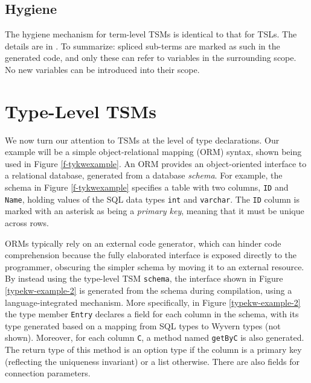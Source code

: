 \documentclass{sig-alternate}[10pt]
\newcommand{\simpleHTMLcolor}[1]{\textcolor[HTML]{7D5100}{#1}}
\newcommand{\boolIfcolor}[1]{\textcolor[HTML]{CD7300}{#1}}
\newcommand{\lstinlinew}[1]{\lstinline[style=wyvern]{#1}}
\begin{document}
\subsection{Hygiene}
The hygiene mechanism for term-level TSMs is identical to that for TSLs. The details are in \cite{TSLs}. To summarize: spliced sub-terms are marked as such in the generated code, and only these can refer to variables in the surrounding scope. No new variables can be introduced into their scope. %


\section{Type-Level TSM\lowercase{s}}\label{tsms-type}
We now turn our attention to TSMs at the level of type declarations. Our example will be a simple object-relational mapping (ORM) syntax, shown being used in Figure \ref{f-tykwexample}. An ORM provides an object-oriented interface to a relational database, generated from a database \emph{schema}. For example, the schema in Figure \ref{f-tykwexample} specifies a table with two columns, \lstinlinew{ID} and \lstinlinew{Name}, holding values of the SQL data types \lstinlinew{int} and \lstinlinew{varchar}. The \lstinlinew{ID} column is marked with an asterisk as being a \emph{primary key}, meaning that it must be unique across rows. 

ORMs typically rely on an external code generator, which can hinder code comprehension because the fully elaborated interface is exposed directly to the programmer, obscuring the simpler schema by moving it to an external resource. By instead using the type-level TSM \lstinlinew{schema}, the interface shown in Figure \ref{typekw-example-2} is generated from the schema during compilation, using a language-integrated mechanism. More specifically, in Figure \ref{typekw-example-2} the type member \lstinlinew{Entry} declares a field for each column in the schema, with its type generated based on a mapping from SQL types to Wyvern types (not shown). Moreover, for each column \lstinlinew{C}, a method named \lstinlinew{getByC} is also generated. The return type of this method is an option type if the column is a primary key (reflecting the uniqueness invariant) or a list otherwise. There are also fields for connection parameters. 
\end{document}
